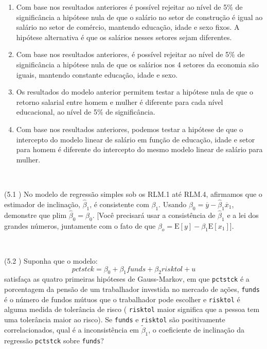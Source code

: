 \documentclass[12pt,letterpaper, onecolumn]{exam}
\begin{document}
\begin{questions}
\begin{enumerate}[label=(\arabic*)]
    \item Com base nos resultados anteriores é possível rejeitar ao nível de 5\% de significância a hipótese nula de que o salário no setor de construção é igual ao salário no setor de comércio, mantendo educação, idade e sexo fixos. A hipótese alternativa é que os salários nesses setores sejam diferentes.
    
    \item Com base nos resultados anteriores, é possível rejeitar ao nível de 5\% de significância a hipótese nula de que os salários nos 4 setores da economia são iguais, mantendo constante educação, idade e sexo.
    
    \item Os resultados do modelo anterior permitem testar a hipótese nula de que o retorno salarial entre homem e mulher é diferente para cada nível educacional, ao nível de 5\% de significância.
    
    \item Com base nos resultados anteriores, podemos testar a hipótese de que o intercepto do modelo linear de salário em função de educação, idade e setor para homem é diferente do intercepto do mesmo modelo linear de salário para mulher.
\end{enumerate}
\
\


    
\question\qstar (5.1 \citep{wooldridge2016}) No modelo de regressão simples sob os RLM.1 até RLM.4, afirmamos que o estimador de inclinação, $\hat\beta_1$, é consistente com $\beta_1$. Usando $\beta_0 = \overline y - \hat\beta_1\overline x_1$, demonstre que plim $\hat\beta_0 = \beta_0$. [Você precisará usar a consistência de $\hat\beta_1$ e a lei dos grandes números, juntamente com o fato de que $\beta_o = \text{E}[y] - \beta_1\text{E}[x_1]$].


\
\


\question (5.2 \citep{wooldridge2016}) Suponha que o modelo:
\begin{equation}
    pctstck = \beta_0 + \beta_1funds + \beta_2risktol + u
\end{equation} satisfaça as quatro primeiras hipóteses de Gauss-Markov, em que \texttt{pctstck} é a porcentagem da pensão de um trabalhador investida no mercado de ações, \texttt{funds} é o número de fundos mútuos que o trabalhador pode escolher e \texttt{risktol} é alguma medida de tolerância de risco ( \texttt{risktol} maior significa que a pessoa tem uma tolerância maior ao risco). Se  \texttt{funds} e  \texttt{risktol} são positivamente correlacionados, qual é a inconsistência em $\tilde\beta_1$, o coeficiente de inclinação da regressão  \texttt{pctstck} sobre \texttt{funds}?


\end{questions}
\end{document}
